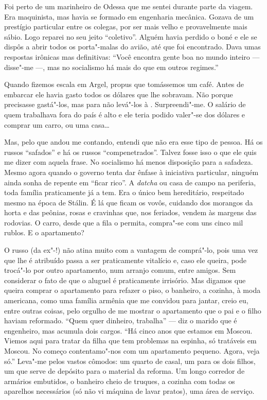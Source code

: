 Foi perto de um marinheiro de Odessa que me sentei durante parte da
viagem. Era maquinista, mas havia se formado em engenharia mecânica.
Gozava de um prestígio particular entre os colegas, por ser mais velho e
provavelmente mais sábio. Logo reparei no seu jeito ``coletivo''. Alguém
havia perdido o boné e ele se dispôs a abrir todos os porta"-malas do
avião, até que foi encontrado. Dava umas respostas irônicas mas
definitivas: ``Você encontra gente boa no mundo inteiro --- disse"-me ---,
mas no socialismo há mais do que em outros regimes.''

Quando fizemos escala em Argel, propus que tomássemos um café. Antes de
embarcar ele havia gasto todos os dólares que lhe sobravam. Não porque
precisasse gastá"-los, mas para não levá"-los à . Surpreendi"-me. O
salário de quem trabalhava fora do país é alto e ele teria podido
valer"-se dos dólares e comprar um carro, ou uma casa\ldots{}

Mas, pelo que andou me contando, entendi que não era esse tipo de
pessoa. Há os russos ``safados'' e há os russos ``compenetrados''.
Talvez fosse isso o que ele quis me dizer com aquela frase. No
socialismo há menos disposição para a safadeza. Mesmo agora quando o
governo tenta dar ênfase à iniciativa particular, ninguém ainda sonha de
repente em ``ficar rico''. A \emph{datcha} ou casa de campo na
periferia, toda família praticamente já a tem. Era o único bem
hereditário, respeitado mesmo na época de Stálin. É lá que ficam os
vovôs, cuidando dos morangos da horta e das peônias, rosas e cravinhas
que, nos feriados, vendem às margens das rodovias. O carro, desde que a
fila o permita, compra"-se com uns cinco mil rublos. E o apartamento?

O russo (da ex"-!) não atina muito com a vantagem de comprá"-lo, pois
uma vez que lhe é atribuído passa a ser praticamente vitalício e, caso
ele queira, pode trocá"-lo por outro apartamento, num arranjo comum,
entre amigos. Sem considerar o fato de que o aluguel é praticamente
irrisório. Mas digamos que queira comprar o apartamento para refazer o
piso, o banheiro, a cozinha, à moda americana, como uma família armênia
que me convidou para jantar, creio eu, entre outras coisas, pelo orgulho
de me mostrar o apartamento que o pai e o filho haviam reformado. ``Quem
quer dinheiro, trabalha'' --- diz o marido que é engenheiro, mas acumula
dois cargos. ``Há cinco anos que estamos em Moscou. Viemos aqui para
tratar da filha que tem problemas na espinha, só tratáveis em Moscou. No
começo contentamo"-nos com um apartamento pequeno. Agora, veja só.''
Leva"-me pelos vastos cômodos: um quarto de casal, um para os dois
filhos, um que serve de depósito para o material da reforma. Um longo
corredor de armários embutidos, o banheiro cheio de truques, a cozinha
com todas os aparelhos necessários (só não vi máquina de lavar pratos),
uma área de serviço.

